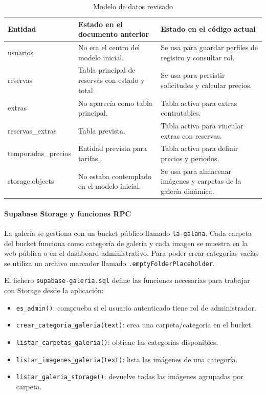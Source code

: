\documentclass[11pt,a4paper]{article}
\begin{document}
\begin{table}[H]
\centering
\small
\begin{tabularx}{\textwidth}{|p{3.2cm}|p{4.4cm}|X|}
\hline
\textbf{Entidad} & \textbf{Estado en el documento anterior} & \textbf{Estado en el código actual} \\
\hline
usuarios & No era el centro del modelo inicial. & Se usa para guardar perfiles de registro y consultar rol. \\
\hline
reservas & Tabla principal de reservas con estado y total. & Se usa para persistir solicitudes y calcular precios. \\
\hline
extras & No aparecía como tabla principal. & Tabla activa para extras contratables. \\
\hline
reservas\_extras & Tabla prevista. & Tabla activa para vincular extras con reservas. \\
\hline
temporadas\_precios & Entidad prevista para tarifas. & Tabla activa para definir precios y periodos. \\
\hline
storage.objects & No estaba contemplado en el modelo inicial. & Se usa para almacenar imágenes y carpetas de la galería dinámica. \\
\hline
\end{tabularx}
\caption{Modelo de datos revisado}
\end{table}

\paragraph{Supabase Storage y funciones RPC}
La galería se gestiona con un bucket público llamado \texttt{la-galana}. Cada carpeta del bucket funciona como categoría de galería y cada imagen se muestra en la web pública o en el dashboard administrativo. Para poder crear categorías vacías se utiliza un archivo marcador llamado \texttt{.emptyFolderPlaceholder}.

El fichero \texttt{supabase-galeria.sql} define las funciones necesarias para trabajar con Storage desde la aplicación:
\begin{itemize}[leftmargin=1.4cm]
  \item \texttt{es\_admin()}: comprueba si el usuario autenticado tiene rol de administrador.
  \item \texttt{crear\_categoria\_galeria(text)}: crea una carpeta/categoría en el bucket.
  \item \texttt{listar\_carpetas\_galeria()}: obtiene las categorías disponibles.
  \item \texttt{listar\_imagenes\_galeria(text)}: lista las imágenes de una categoría.
  \item \texttt{listar\_galeria\_storage()}: devuelve todas las imágenes agrupadas por carpeta.
\end{itemize}
\end{document}

